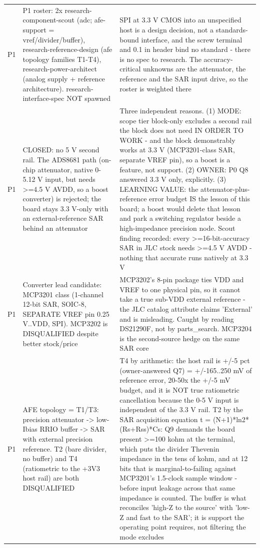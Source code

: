 \documentclass[11pt,a4paper]{article}
\begin{document}
{\begin{longtable}{lp{5.2cm}p{7.2cm}}
P1 & P1 roster: 2x research-component-scout (adc; afe-support = vref/divider/buffer), research-reference-design (afe topology families T1-T4), research-power-architect (analog supply + reference architecture). research-interface-spec NOT spawned & SPI at 3.3 V CMOS into an unspecified host is a design decision, not a standards-bound interface, and the screw terminal and 0.1 in header bind no standard - there is no spec to research. The accuracy-critical unknowns are the attenuator, the reference and the SAR input drive, so the roster is weighted there \\
P1 & CLOSED: no 5 V second rail. The ADS8681 path (on-chip attenuator, native 0-5.12 V input, but needs \textgreater{}=4.5 V AVDD, so a boost converter) is rejected; the board stays 3.3 V-only with an external-reference SAR behind an attenuator & Three independent reasons. (1) MODE: scope tier block-only excludes a second rail the block does not need IN ORDER TO WORK - and the block demonstrably works at 3.3 V (MCP3201-class SAR, separate VREF pin), so a boost is a feature, not support. (2) OWNER: P0 Q8 answered 3.3 V only, explicitly. (3) LEARNING VALUE: the attenuator-plus-reference error budget IS the lesson of this board; a boost would delete that lesson and park a switching regulator beside a high-impedance precision node. Scout finding recorded: every \textgreater{}=16-bit-accuracy SAR in JLC stock needs \textgreater{}=4.5 V AVDD - nothing that accurate runs natively at 3.3 V \\
P1 & Converter lead candidate: MCP3201 class (1-channel 12-bit SAR, SOIC-8, SEPARATE VREF pin 0.25 V..VDD, SPI). MCP3202 is DISQUALIFIED despite better stock/price & MCP3202's 8-pin package ties VDD and VREF to one physical pin, so it cannot take a true sub-VDD external reference - the JLC catalog attribute claims 'External' and is misleading. Caught by reading DS21290F, not by parts\_search. MCP3204 is the second-source hedge on the same SAR core \\
P1 & AFE topology = T1/T3: precision attenuator -\textgreater{} low-Ibias RRIO buffer -\textgreater{} SAR with external precision reference. T2 (bare divider, no buffer) and T4 (ratiometric to the +3V3 host rail) are both DISQUALIFIED & T4 by arithmetic: the host rail is +/-5 pct (owner-answered Q7) = +/-165..250 mV of reference error, 20-50x the +/-5 mV budget, and it is NOT true ratiometric cancellation because the 0-5 V input is independent of the 3.3 V rail. T2 by the SAR acquisition equation t = (N+1){*}ln2{*}(Rs+Rss){*}Cs: Q9 demands the board present \textgreater{}=100 kohm at the terminal, which puts the divider Thevenin impedance in the tens of kohm, and at 12 bits that is marginal-to-failing against MCP3201's 1.5-clock sample window - before input leakage across that same impedance is counted. The buffer is what reconciles 'high-Z to the source' with 'low-Z and fast to the SAR'; it is support the operating point requires, not filtering the mode excludes \\

\end{longtable}}
\end{document}
